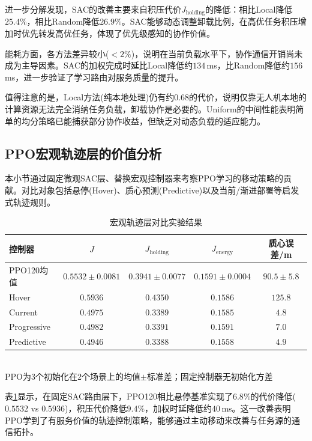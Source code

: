 进一步分解发现，SAC的改善主要来自积压代价$J_{\mathrm{holding}}$的降低：相比Local降低$25.4\%$，相比Random降低$26.9\%$。SAC能够动态调整卸载比例，在高优任务积压增加时优先转发高优任务，体现了优先级感知的协作价值。

能耗方面，各方法差异较小($<2\%$)，说明在当前负载水平下，协作通信开销尚未成为主导因素。SAC的加权完成时延比Local降低约$134\,$ms，比Random降低约$156\,$ms，进一步验证了学习路由对服务质量的提升。

值得注意的是，Local方法(纯本地处理)仍有约$0.68$的代价，说明仅靠无人机本地的计算资源无法完全消纳任务负载，卸载协作是必要的。Uniform的中间性能表明简单的均分策略已能捕获部分协作收益，但缺乏对动态负载的适应能力。

\subsection{PPO宏观轨迹层的价值分析}
\label{ssec:ppo_macro_value}

本小节通过固定微观SAC层、替换宏观控制器来考察PPO学习的移动策略的贡献。对比对象包括悬停(Hover)、质心预测(Predictive)以及当前/渐进部署等启发式轨迹规则。

\begin{table}[htbp]
\centering
\caption{宏观轨迹层对比实验结果}
\label{tab:macro_comparison}
\begin{tabular}{lcccc}
\toprule
控制器 & $J$ & $J_{\mathrm{holding}}$ & $J_{\mathrm{energy}}$ & 质心误差/m \\
\midrule
PPO120均值 & $0.5532\pm0.0081$ & $0.3941\pm0.0077$ & $0.1591\pm0.0004$ & $90.5\pm5.8$ \\
Hover & $0.5936$ & $0.4350$ & $0.1586$ & $125.8$ \\
Current & $0.4975$ & $0.3389$ & $0.1585$ & $4.8$ \\
Progressive & $0.4982$ & $0.3391$ & $0.1591$ & $7.0$ \\
Predictive & $0.4946$ & $0.3388$ & $0.1558$ & $4.9$ \\
\bottomrule
\end{tabular}
\\[3pt]
\scriptsize PPO为3个初始化在2个场景上的均值$\pm$标准差；固定控制器无初始化方差
\end{table}

表\ref{tab:macro_comparison}显示，在固定SAC路由层下，PPO120相比悬停基准实现了$6.8\%$的代价降低($0.5532$ vs $0.5936$)，积压代价降低$9.4\%$，加权时延降低约$40\,$ms。这一改善表明PPO学到了有服务价值的轨迹控制策略，能够通过主动移动来改善与任务源的通信拓扑。

